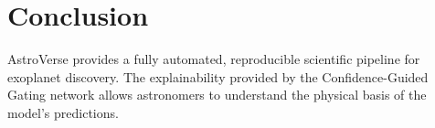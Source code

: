 \section{Conclusion}
AstroVerse provides a fully automated, reproducible scientific pipeline for exoplanet discovery. The explainability provided by the Confidence-Guided Gating network allows astronomers to understand the physical basis of the model's predictions.
